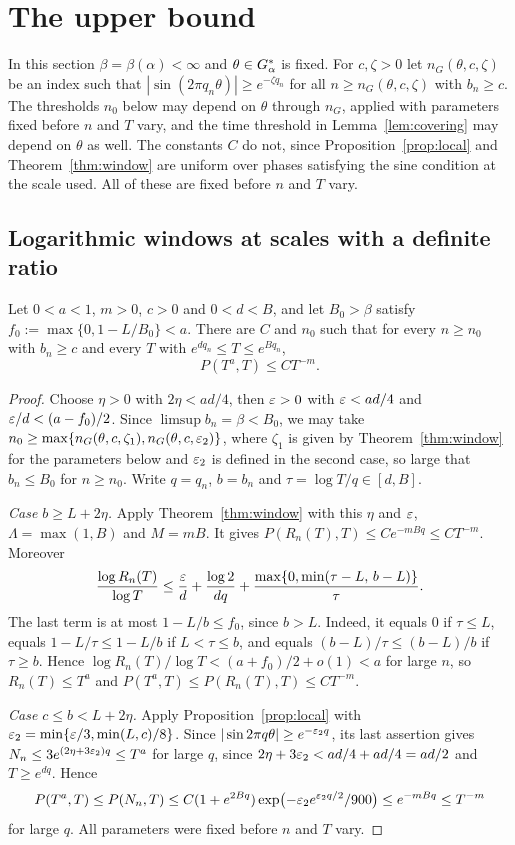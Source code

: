 \section{The upper bound}\label{sec:upper}

In this section $\beta=\beta(\alpha)<\infty$ and $\theta\in G_\alpha^*$ is fixed. For $c,\zeta>0$ let $n_G(\theta,c,\zeta)$ be an index such that $|\sin(2\pi q_n\theta)|\ge e^{-\zeta q_n}$ for all $n\ge n_G(\theta,c,\zeta)$ with $b_n\ge c$. The thresholds $n_0$ below may depend on $\theta$ through $n_G$, applied with parameters fixed before $n$ and $T$ vary, and the time threshold in Lemma~\ref{lem:covering} may depend on $\theta$ as well. The constants $C$ do not, since Proposition~\ref{prop:local} and Theorem~\ref{thm:window} are uniform over phases satisfying the sine condition at the scale used. All of these are fixed before $n$ and $T$ vary.

\subsection{Logarithmic windows at scales with a definite ratio}

\begin{proposition}\label{prop:selected}
Let $0<a<1$, $m>0$, $c>0$ and $0<d<B$, and let $B_0>\beta$ satisfy $f_0:=\max\{0,1-L/B_0\}<a$. There are $C$ and $n_0$ such that for every $n\ge n_0$ with $b_n\ge c$ and every $T$ with $e^{dq_n}\le T\le e^{Bq_n}$,
\[
P(T^a,T)\le CT^{-m}.
\]
\end{proposition}

\begin{proof}
Choose $\eta>0$ with $2\eta<ad/4$, then $\varepsilon>0$ with $\varepsilon<ad/4$ and $\varepsilon/d<(a-f_0)/2$. Since $\limsup b_n=\beta<B_0$, we may take $n_0\ge\max\{n_G(\theta,c,\zeta_1),n_G(\theta,c,\varepsilon_2)\}$, where $\zeta_1$ is given by Theorem~\ref{thm:window} for the parameters below and $\varepsilon_2$ is defined in the second case, so large that $b_n\le B_0$ for $n\ge n_0$. Write $q=q_n$, $b=b_n$ and $\tau=\log T/q\in[d,B]$.

\emph{Case $b\ge L+2\eta$.} Apply Theorem~\ref{thm:window} with this $\eta$ and $\varepsilon$, $\Lambda=\max(1,B)$ and $M=mB$. It gives $P(R_n(T),T)\le Ce^{-mBq}\le CT^{-m}$. Moreover
\[
\frac{\log R_n(T)}{\log T}\le\frac{\varepsilon}{d}+\frac{\log2}{dq}+\frac{\max\{0,\min(\tau-L,\,b-L)\}}{\tau}.
\]
The last term is at most $1-L/b\le f_0$, since $b>L$. Indeed, it equals $0$ if $\tau\le L$, equals $1-L/\tau\le1-L/b$ if $L<\tau\le b$, and equals $(b-L)/\tau\le(b-L)/b$ if $\tau\ge b$. Hence $\log R_n(T)/\log T<(a+f_0)/2+o(1)<a$ for large $n$, so $R_n(T)\le T^a$ and $P(T^a,T)\le P(R_n(T),T)\le CT^{-m}$.

\emph{Case $c\le b<L+2\eta$.} Apply Proposition~\ref{prop:local} with $\varepsilon_2=\min\{\varepsilon/3,\min(L,c)/8\}$. Since $|\sin2\pi q\theta|\ge e^{-\varepsilon_2q}$, its last assertion gives $N_n\le3e^{(2\eta+3\varepsilon_2)q}\le T^a$ for large $q$, since $2\eta+3\varepsilon_2<ad/4+ad/4=ad/2$ and $T\ge e^{dq}$. Hence
\[
P(T^a,T)\le P(N_n,T)\le C(1+e^{2Bq})\exp\bigl(-\varepsilon_2e^{\varepsilon_2q/2}/900\bigr)\le e^{-mBq}\le T^{-m}
\]
for large $q$. All parameters were fixed before $n$ and $T$ vary.
\end{proof}

